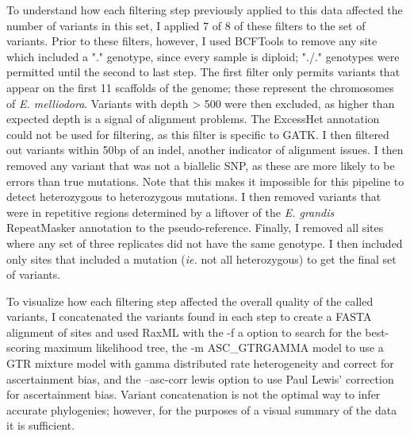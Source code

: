 To understand how each filtering step previously applied to this data affected the number of variants in this set, I applied 7 of 8 of these filters to the set of variants. Prior to these filters, however, I used BCFTools to remove any site which included a "." genotype, since every sample is diploid; "./." genotypes were permitted until the second to last step. The first filter only permits variants that appear on the first 11 scaffolds of the genome; these represent the chromosomes of \textit{E. melliodora}. Variants with depth > 500 were then excluded, as higher than expected depth is a signal of alignment problems. The ExcessHet annotation could not be used for filtering, as this filter is specific to GATK. I then filtered out variants within 50bp of an indel, another indicator of alignment issues. I then removed any variant that was not a biallelic SNP, as these are more likely to be errors than true mutations. Note that this makes it impossible for this pipeline to detect heterozygous to heterozygous mutations. I then removed variants that were in repetitive regions determined by a liftover of the \textit{E. grandis} RepeatMasker annotation to the pseudo-reference. Finally, I removed all sites where any set of three replicates did not have the same genotype. I then included only sites that included a mutation (\textit{ie.} not all heterozygous) to get the final set of variants.

To visualize how each filtering step affected the overall quality of the called variants, I concatenated the variants found in each step to create a FASTA alignment of sites and used RaxML with the -f a option to search for the best-scoring maximum likelihood tree, the -m ASC\_GTRGAMMA model to use a GTR mixture model with gamma distributed rate heterogeneity and correct for ascertainment bias, and the --asc-corr lewis option to use Paul Lewis' correction for ascertainment bias. Variant concatenation is not the optimal way to infer accurate phylogenies; however, for the purposes of a visual summary of the data it is sufficient.

